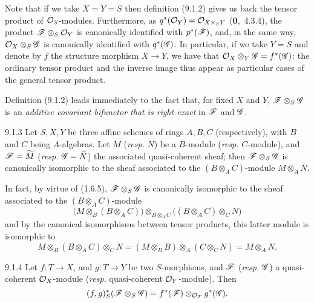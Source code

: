 \documentclass[../main.tex]{subfiles}
\begin{document}
Note that if we take $X=Y=S$ then definition (9.1.2) gives us back the tensor product of $\mathcal{O}_S$-modules.
Furthermore, as $q^*(\mathcal{O}_Y)=\mathcal{O}_{X\times_S Y}$ (\textbf{0},~4.3.4), the product $\mathscr{F}\otimes_S\mathcal{O}_Y$ is canonically identified with $p^*(\mathscr{F})$, and, in the same way, $\mathcal{O}_X\otimes_S\mathscr{G}$ is canonically identified with $q^*(\mathscr{G})$.
In particular, if we take $Y=S$ and denote by $f$ the structure morphism $X\to Y$, we have that $\mathcal{O}_X\otimes_Y\mathscr{G}=f^*(\mathscr{G})$: the ordinary tensor product and the inverse image thus appear as particular cases of the general tensor product.

Definition (9.1.2) leads immediately to the fact that, for fixed $X$ and $Y$, $\mathscr{F}\otimes_S\mathscr{G}$ is an \emph{additive covariant bifunctor that is right-exact} in $\mathscr{F}$ and $\mathscr{G}$.

\begin{cx}[Proposition]{9.1.3}
    Let $S,X,Y$ be three affine schemes of rings $A,B,C$ (respectively), with $B$ and $C$ being $A$-algebras.
    Let $M$ (\emph{resp.} $N$) be a $B$-module (\emph{resp.} $C$-module), and $\mathscr{F}=\widetilde{M}$ (\emph{resp.} $\mathscr{G}=\widetilde{N}$) the associated quasi-coherent sheaf; then $\mathscr{F}\otimes_S\mathscr{G}$ is canonically isomorphic to the sheaf associated to the $(B\otimes_A C)$-module $M\otimes_A N$.
\end{cx}

In fact, by virtue of (1.6.5), $\mathscr{F}\otimes_S\mathscr{G}$ is canonically isomorphic to the sheaf associated to the $(B\otimes_A C)$-module
\begin{equation*}
    \big( M\otimes_B(B\otimes_A C) \big) \otimes_{B\otimes_A C} \big( (B\otimes_A C)\otimes_C N \big)
\end{equation*}
and by the canonical isomorphisms between tensor products, this latter module is isomorphic to
\begin{equation*}
    M\otimes_B(B\otimes_A C)\otimes_C N = (M\otimes_B B)\otimes_A(C\otimes_C N) = M\otimes_A N.
\end{equation*}

\begin{cx}[Proposition]{9.1.4}
    Let $f\colon T\to X$, and $g\colon T\to Y$ be two $S$-morphisms, and $\mathscr{F}$ (\emph{resp.} $\mathscr{G}$) a quasi-coherent $\mathcal{O}_X$-module (\emph{resp.} quasi-coherent $\mathcal{O}_Y$-module).
    Then
    \begin{equation*}
        (f,g)^*_S(\mathscr{F}\otimes_S\mathscr{G}) = f^*(\mathscr{F})\otimes_{\mathcal{O}_T}g^*(\mathscr{G}).
    \end{equation*}
\end{cx}
\end{document}
